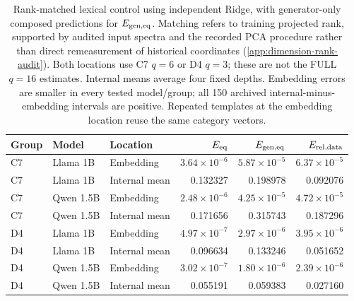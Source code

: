 \begin{table}[t]
\centering
\small
\begin{tabular}{lllrrr}
\toprule
Group & Model & Location & $E_{\rm eq}$ & $E_{\rm gen,eq}$ & $E_{\rm rel,data}$ \\
\midrule
C7 & Llama 1B & Embedding & $3.64\!\times\!10^{-6}$ & $5.87\!\times\!10^{-5}$ & $6.37\!\times\!10^{-5}$ \\
C7 & Llama 1B & Internal mean & 0.132327 & 0.198978 & 0.092076 \\
C7 & Qwen 1.5B & Embedding & $2.48\!\times\!10^{-6}$ & $4.25\!\times\!10^{-5}$ & $4.72\!\times\!10^{-5}$ \\
C7 & Qwen 1.5B & Internal mean & 0.171656 & 0.315743 & 0.187296 \\
D4 & Llama 1B & Embedding & $4.97\!\times\!10^{-7}$ & $2.97\!\times\!10^{-6}$ & $3.95\!\times\!10^{-6}$ \\
D4 & Llama 1B & Internal mean & 0.096634 & 0.133246 & 0.051652 \\
D4 & Qwen 1.5B & Embedding & $3.02\!\times\!10^{-7}$ & $1.80\!\times\!10^{-6}$ & $2.39\!\times\!10^{-6}$ \\
D4 & Qwen 1.5B & Internal mean & 0.055191 & 0.059383 & 0.027160 \\
\bottomrule
\end{tabular}
\caption{Rank-matched lexical control using independent Ridge, with generator-only composed predictions for $E_{\rm gen,eq}$. Matching refers to training projected rank, supported by audited input spectra and the recorded PCA procedure rather than direct remeasurement of historical coordinates (\cref{app:dimension-rank-audit}). Both locations use C7 $q=6$ or D4 $q=3$; these are not the FULL $q=16$ estimates. Internal means average four fixed depths. Embedding errors are smaller in every tested model/group; all 150 archived internal-minus-embedding intervals are positive. Repeated templates at the embedding location reuse the same category vectors.}
\label{tab:lexical-control}
\end{table}
